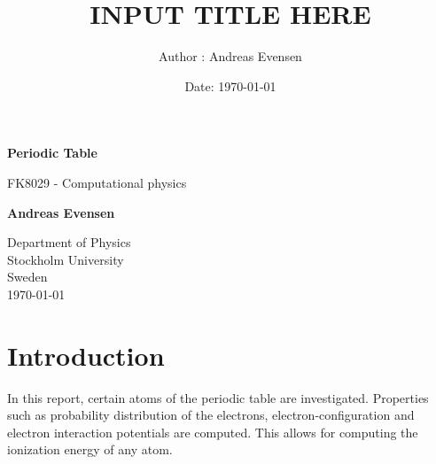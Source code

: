 \documentclass[a4paper]{article}
\title{INPUT TITLE HERE}
\author{Author : Andreas Evensen}
\date{Date: \today}
\begin{document}
\begin{titlepage}
    \begin{center}
        \vspace*{1cm}

        \Huge
        \textbf{Periodic Table}

        \vspace{0.5cm}
        \LARGE
        FK8029 - Computational physics

        \vspace{1.5cm}

        \textbf{Andreas Evensen}

        \vfill


        \Large
        Department of Physics\\
        Stockholm University\\
        Sweden\\
        \today
    \end{center}
\end{titlepage}

\section{Introduction}
In this report, certain atoms of the periodic table are investigated. Properties such as probability distribution of the electrons, electron-configuration and electron interaction potentials are computed. This allows for computing the ionization energy of any atom.
\tableofcontents
\newpage
\end{document}
